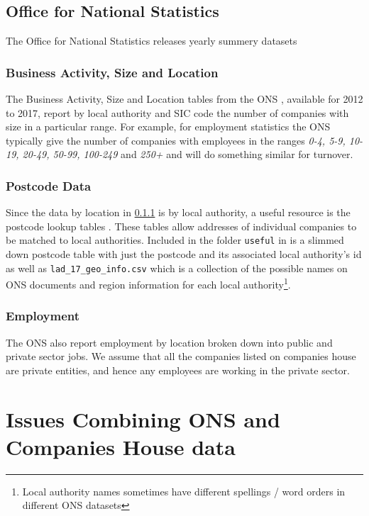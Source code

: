 \documentclass[a4paper,10pt]{article}
\begin{document}
   \subsection{Office for National Statistics}
   The Office for National Statistics releases yearly summery datasets
   \subsubsection{Business Activity, Size and Location}
   \label{basl}
   The Business Activity, Size and Location tables from the ONS \cite{basl}, available for 2012 to 2017, report by local authority and SIC code the number of companies with size in a particular range. For example, for employment statistics the ONS typically give the number of companies with employees in the ranges \emph{0-4, 5-9, 10-19, 20-49, 50-99, 100-249} and \emph{250+} and will do something similar for turnover.
   
   \subsubsection{Postcode Data}

   Since the data by location in \ref{basl} is by local authority, a useful resource is the postcode lookup tables \cite{postcodes}. These tables allow addresses of individual companies to be matched to local authorities. Included in the folder \texttt{useful} in \cite{github} is a slimmed down postcode table with just the postcode and its associated local authority's id as well as \texttt{lad\_17\_geo\_info.csv} which is a collection of the possible names on ONS documents and region information for each local authority\footnote{Local authority names sometimes have different spellings / word orders in different ONS datasets}.

   \subsubsection{Employment}

   The ONS also report employment \cite{employment} by location broken down into public and private sector jobs. We assume that all the companies listed on companies house are private entities, and hence any employees are working in the private sector.

   \section{Issues Combining ONS and Companies House data}
\end{document}
